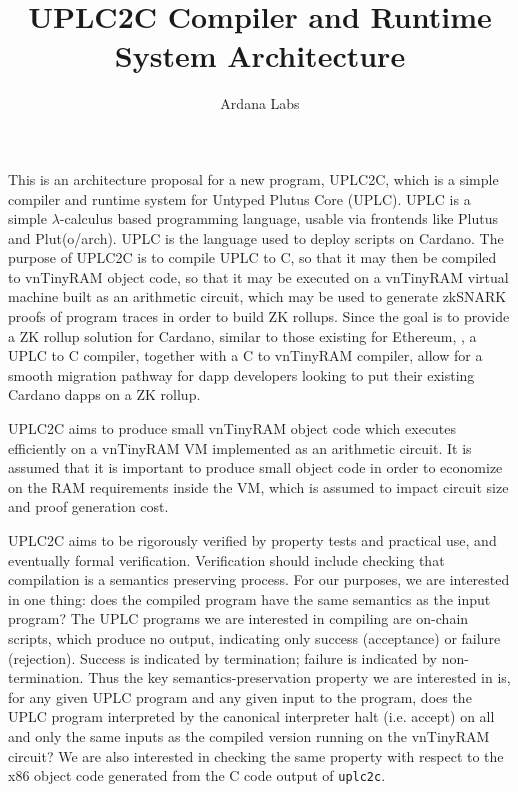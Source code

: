 \documentclass[12pt]{article}
\title{UPLC2C Compiler and Runtime System Architecture}
\author{Ardana Labs}
\begin{document}
\maketitle

This is an architecture proposal for a new program, UPLC2C, which is a simple compiler and runtime system for Untyped Plutus Core (UPLC). UPLC is a simple $\lambda$-calculus based programming language, usable via frontends like Plutus \cite{plutus} and Plut(o/arch). \cite{pluto,plutarch} UPLC is the language used to deploy scripts on Cardano. The purpose of UPLC2C is to compile UPLC to C, so that it may then be compiled to vnTinyRAM \cite{vntinyram} object code, so that it may be executed on a vnTinyRAM virtual machine built as an arithmetic circuit, which may be used to generate zkSNARK proofs of program traces in order to build ZK rollups. Since the goal is to provide a ZK rollup solution for Cardano, similar to those existing for Ethereum, \cite{ethworks-20}, a UPLC to C compiler, together with a C to vnTinyRAM compiler, allow for a smooth migration pathway for dapp developers looking to put their existing Cardano dapps on a ZK rollup.

UPLC2C aims to produce small vnTinyRAM object code which executes efficiently on a vnTinyRAM VM implemented as an arithmetic circuit. It is assumed that it is important to produce small object code in order to economize on the RAM requirements inside the VM, which is assumed to impact circuit size and proof generation cost. 

UPLC2C aims to be rigorously verified by property tests and practical use, and eventually formal verification. Verification should include checking that compilation is a semantics preserving process. For our purposes, we are interested in one thing: does the compiled program have the same semantics as the input program? The UPLC programs we are interested in compiling are on-chain scripts, which produce no output, indicating only success (acceptance) or failure (rejection). Success is indicated by termination; failure is indicated by non-termination. Thus the key semantics-preservation property we are interested in is, for any given UPLC program and any given input to the program, does the UPLC program interpreted by the canonical interpreter halt (i.e. accept) on all and only the same inputs as the compiled version running on the vnTinyRAM circuit? We are also interested in checking the same property with respect to the x86 object code generated from the C code output of \texttt{uplc2c}.
\end{document}
